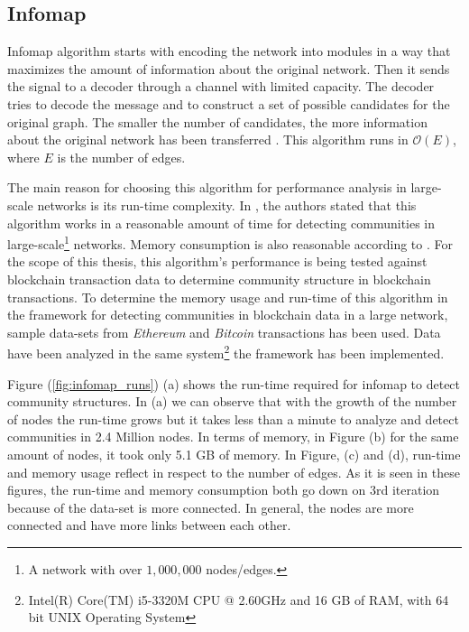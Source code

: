 \subsection{Infomap}
Infomap algorithm starts with encoding the network into modules in a way that maximizes the amount of information about the original network. Then it sends the signal to a decoder through a channel with limited capacity. The decoder tries to decode the message and to construct a set of possible candidates for the original graph. The smaller the number of candidates, the more information about the original network has been transferred \cite{ref-49}. This algorithm runs in $\mathcal{O}(E)$, where $E$ is the number of edges. 

The main reason for choosing this algorithm for performance analysis in large-scale networks is its run-time complexity. In \cite{ref-47}, the authors stated that this algorithm works in a reasonable amount of time for detecting communities in large-scale\footnote{A network with over $1,000,000$ nodes/edges.}\label{foot:large-scale} networks. Memory consumption is also reasonable according to \cite{ref-47}. For the scope of this thesis, this algorithm's performance is being tested against blockchain transaction data to determine community structure in blockchain transactions. To determine the memory usage and run-time of this algorithm in the framework for detecting communities in blockchain data in a large network, sample data-sets from \textit{Ethereum} and \textit{Bitcoin} transactions has been used. Data have been analyzed in the same system\footnote{Intel(R) Core(TM) i5-3320M CPU @ 2.60GHz and 16 GB of RAM, with 64 bit UNIX Operating System} the framework has been implemented. 

Figure (\ref{fig:infomap_runs}) (a) shows the run-time required for infomap to detect community structures. In (a) we can observe that with the growth of the number of nodes the run-time grows but it takes less than a minute to analyze and detect communities in 2.4 Million nodes. In terms of memory, in Figure (b) for the same amount of nodes, it took only 5.1 GB of memory. In Figure, (c) and (d), run-time and memory usage reflect in respect to the number of edges. As it is seen in these figures, the run-time and memory consumption both go down on 3rd iteration because of the data-set is more connected. In general, the nodes are more connected and have more links between each other.

